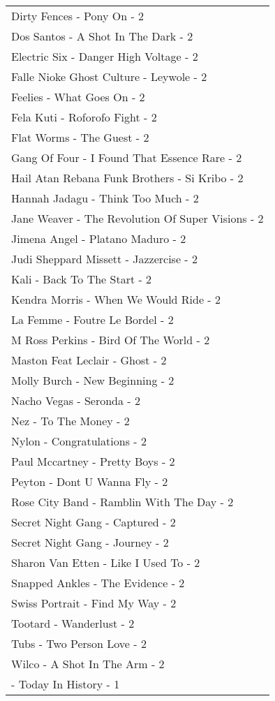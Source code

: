 \documentclass[
]{article}
\begin{document}
\begin{longtable}{l}
Dirty Fences - Pony On - 2 \\ 
Dos Santos - A Shot In The Dark - 2 \\ 
Electric Six - Danger High Voltage - 2 \\ 
Falle Nioke Ghost Culture - Leywole - 2 \\ 
Feelies - What Goes On - 2 \\ 
Fela Kuti - Roforofo Fight - 2 \\ 
Flat Worms - The Guest - 2 \\ 
Gang Of Four - I Found That Essence Rare - 2 \\ 
Hail Atan Rebana Funk Brothers - Si Kribo - 2 \\ 
Hannah Jadagu - Think Too Much - 2 \\ 
Jane Weaver - The Revolution Of Super Visions - 2 \\ 
Jimena Angel - Platano Maduro - 2 \\ 
Judi Sheppard Missett - Jazzercise - 2 \\ 
Kali - Back To The Start - 2 \\ 
Kendra Morris - When We Would Ride - 2 \\ 
La Femme - Foutre Le Bordel - 2 \\ 
M Ross Perkins - Bird Of The World - 2 \\ 
Maston Feat Leclair - Ghost - 2 \\ 
Molly Burch - New Beginning - 2 \\ 
Nacho Vegas - Seronda - 2 \\ 
Nez - To The Money - 2 \\ 
Nylon - Congratulations - 2 \\ 
Paul Mccartney - Pretty Boys - 2 \\ 
Peyton - Dont U Wanna Fly - 2 \\ 
Rose City Band - Ramblin With The Day - 2 \\ 
Secret Night Gang - Captured - 2 \\ 
Secret Night Gang - Journey - 2 \\ 
Sharon Van Etten - Like I Used To - 2 \\ 
Snapped Ankles - The Evidence - 2 \\ 
Swiss Portrait - Find My Way - 2 \\ 
Tootard - Wanderlust - 2 \\ 
Tubs - Two Person Love - 2 \\ 
Wilco - A Shot In The Arm - 2 \\ 
 - Today In History - 1 \\ 

\end{longtable}
\end{document}
